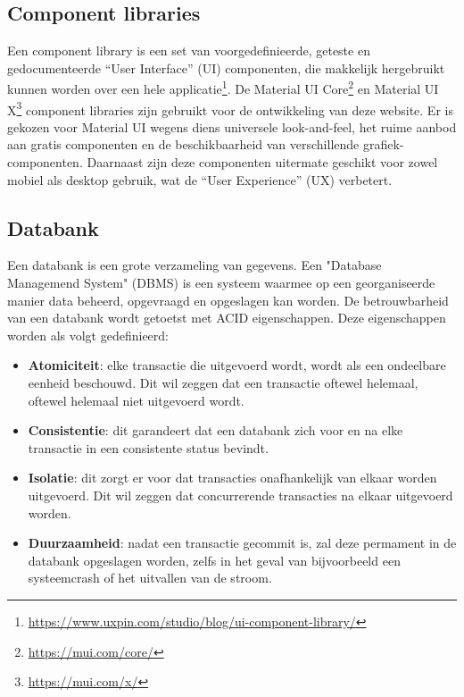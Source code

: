 \subsection{Component libraries}
Een component library is een set van voorgedefinieerde, geteste en gedocumenteerde ``User Interface'' (UI) componenten, die makkelijk hergebruikt kunnen worden over een hele applicatie\footnote{\href{https://www.uxpin.com/studio/blog/ui-component-library/}{https://www.uxpin.com/studio/blog/ui-component-library/}}.
De Material UI Core\footnote{\href{https://mui.com/core/}{https://mui.com/core/}} en Material UI X\footnote{\href{https://mui.com/x/}{https://mui.com/x/}} component libraries zijn gebruikt voor de ontwikkeling van deze website. Er is gekozen voor Material UI wegens diens universele look-and-feel, het ruime aanbod aan gratis componenten en de beschikbaarheid van verschillende grafiek-componenten. Daarnaast zijn deze componenten uitermate geschikt voor zowel mobiel als desktop gebruik, wat de ``User Experience'' (UX) verbetert.

\subsection{Databank}

Een databank is een grote verzameling van gegevens. Een "Database Managemend System" (DBMS) is een systeem waarmee op een georganiseerde manier data beheerd, opgevraagd en opgeslagen kan worden. De betrouwbarheid van een databank wordt getoetst met ACID eigenschappen. Deze eigenschappen worden als volgt gedefinieerd:

\begin{itemize}
    \item \textbf{Atomiciteit}: elke transactie die uitgevoerd wordt, wordt als een ondeelbare eenheid beschouwd. Dit wil zeggen dat een transactie oftewel helemaal, oftewel helemaal niet uitgevoerd wordt.
    \item \textbf{Consistentie}: dit garandeert dat een databank zich voor en na elke transactie in een consistente status bevindt.
    \item \textbf{Isolatie}: dit zorgt er voor dat transacties onafhankelijk van elkaar worden uitgevoerd. Dit wil zeggen dat concurrerende transacties na elkaar uitgevoerd worden.
    \item \textbf{Duurzaamheid}: nadat een transactie gecommit is, zal deze permament in de databank opgeslagen worden, zelfs in het geval van bijvoorbeeld een systeemcrash of het uitvallen van de stroom. 
\end{itemize}

